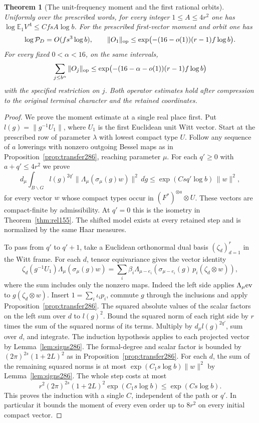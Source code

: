 \documentclass[a4paper,11pt]{article}
\newtheorem{theorem}[proposition]{Theorem}
\theoremstyle{definition}
\theoremstyle{remark}
\numberwithin{equation}{section}
\begin{document}
\begin{theorem}[The unit-frequency moment and the first rational orbits]\leavevmode
\label{thm:moment286}
Uniformly over the prescribed words, for every integer
\(1\le A\le4r^2\) one has \(\log\mathbb E_1 V^A\le CfsA\log b\).
For the prescribed first-vector moment and orbit one has
\[
 \log{\cal P}_D=O(fs^3\log b),\qquad
 \|O_1\|_{\rm op}\le
       \exp\bigl(-(16-o(1))(r-1)f\log b\bigr).
\]
For every fixed \(0<\alpha<16\), on the same intervals,
\[
 \sum_{j\le b^\alpha}\|O_j\|_{\rm op}
       \le \exp\bigl(-(16-\alpha-o(1))(r-1)f\log b\bigr)
\]
with the specified restriction on \(j\). Both operator estimates
hold after compression to the original terminal character and
the retained coordinates.
\end{theorem}
\begin{proof}
We prove the moment estimate at a single real place first. Put
\(l(g)=\|g^{-1}U_1\|\), where \(U_1\) is the first Euclidean
unit Witt vector. Start at the prescribed row of parameter
\(\lambda\) with lowest compact type \(U\). Follow any sequence
of \(a\) lowerings with nonzero outgoing Bessel maps as in
Proposition~\ref{prop:transfer286}, reaching parameter \(\mu\).
For each \(q'\ge0\) with \(a+q'\le4r^2\) we prove
\[
 d_\mu\int_{B\backslash G}l(g)^{2q'}
       \|\Lambda_\mu(\sigma_\mu(g)w)\|^2\,d\dot g
        \le \exp(Csq'\log b)\,\|w\|^2,
\]
for every vector \(w\) whose compact types occur in
\((F^*)^{\otimes a}\otimes U\). These vectors are compact-finite
by admissibility. At \(q'=0\) this is the isometry in
Theorem~\ref{thm:rel155}. The shifted model exists at every
retained step and is normalized by the same Haar measures.

To pass from \(q'\) to \(q'+1\), take a Euclidean orthonormal
dual basis \((\zeta_d)_{d=1}^r\) in the Witt frame.
For each \(d\), tensor equivariance gives the vector identity
\[
 \zeta_d(g^{-1}U_1)\Lambda_\mu(\sigma_\mu(g)w)=
       \sum_{i}\beta_i\Lambda_{\mu-e_i}\!
       \left(\sigma_{\mu-e_i}(g)\,p_i(\zeta_d\otimes w)\right),
\]
where the sum includes only the nonzero maps. Indeed the left
side applies \(\Lambda_\mu{\rm ev}\) to \(g(\zeta_d\otimes w)\).
Insert \(1=\sum_i\iota_i p_i\), commute \(g\) through
the inclusions and apply Proposition~\ref{prop:transfer286}.
The squared absolute values of the scalar factors on the left
sum over \(d\) to \(l(g)^2\). Bound the squared norm of
each right side by \(r\) times the sum of the squared norms
of its terms. Multiply by \(d_\mu l(g)^{2q'}\), sum over
\(d\), and integrate. The induction hypothesis applies to
each projected vector by Lemma~\ref{lem:signs286}. The
formal-degree and scalar factor is bounded by
\((2\pi)^{2s}(1+2L)^2\) as in
Proposition~\ref{prop:transfer286}. For each \(d\), the
sum of the remaining squared norms is at most
\(\exp(C_1s\log b)\|w\|^2\) by Lemma~\ref{lem:signs286}.
The whole step costs at most
\[
        r^2(2\pi)^{2s}(1+2L)^2\exp(C_1s\log b)
                         \le\exp(Cs\log b).
\]
This proves the induction with a single \(C\), independent
of the path or \(q'\). In particular it bounds the moment
of every even order up to \(8r^2\) on every initial compact vector.


\end{proof}
\end{document}
